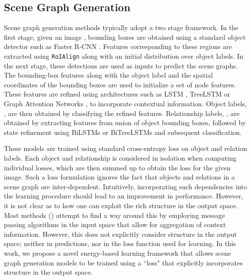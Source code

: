 \documentclass[final]{cvpr}
\begin{document}
\subsection{Scene Graph Generation}
Scene graph generation methods typically adopt a two stage framework. In the first stage, given an image , bounding boxes 
are obtained using a standard object detector such as Faster R-CNN \cite{ren2015faster}. Features
corresponding to these regions are extracted using {\tt RoIAlign} along with an initial distribution over object labels. 
In the next stage, these detections are used as inputs to predict the scene graphs. The bounding-box features along with the object label and the spatial coordinates of the bounding boxes are used to initialize a set of node features. These features are refined using architectures such as LSTM \cite{zellers2018neural}, TreeLSTM \cite{tang2019learning} or Graph Attention Networks \cite{yang2018graph}, to incorporate contextual information. Object labels, , are then obtained by classifying the refined features. Relationship labels, , are obtained by extracting features from union of object bounding boxes, followed by state refinement using BiLSTMs \cite{zellers2018neural} or BiTreeLSTMs \cite{tang2019learning} and subsequent classification. 

These models are trained using standard cross-entropy loss on object and relation labels. Each object and relationship is considered in isolation when computing individual losses, which are then summed up to obtain the loss for the given image. Such a loss formulation ignores the fact that objects and relations in a scene graph are inter-dependent. Intuitively, incorporating such dependencies into the learning procedure should lead to an improvement in performance. However, it is not clear as to how one can exploit the rich structure in the output space. Most methods (\cite{tang2019learning,xu2017scene, yang2018graph,zellers2018neural}) attempt to find a way around this by employing message passing algorithms in the input space that allow for aggregation of context information. However, this does not explicitly consider structure in the output space; neither in predictions, nor in the loss function used for learning. 
In this work, we propose a novel energy-based learning framework that allows scene graph generation models to be trained using a ``loss" that explicitly incorporates structure in the output space.
\end{document}
